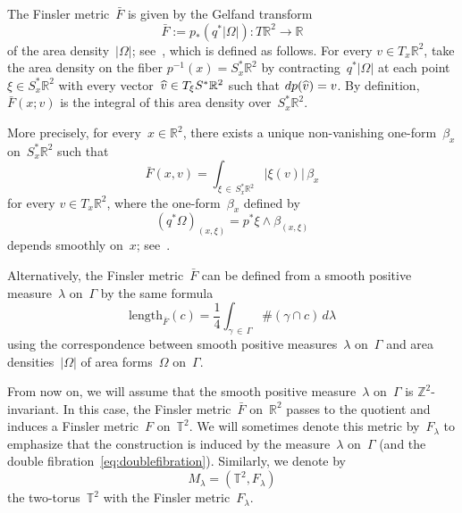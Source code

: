 \documentclass[AHL,Unicode,longabstracts,published]{cedram}
\newcommand{\Z}{\mathbb{Z}}
\newcommand{\R}{\mathbb{R}}
\newcommand{\T}{\mathbb{T}}
\newcommand{\length}{\mathrm{length}}
\let\oldhat\hat
\renewcommand*{\hat}[1]{\mathchoice{\widehat{#1}}{\widehat{#1}}{\oldhat{#1}}{\oldhat{#1}}}
\begin{document}
The Finsler metric~$\bar{F}$ is given by the Gelfand transform
\begin{equation}\label{eq:Gelfand}
\bar{F}:=p_*\left(q^*|\Omega|\right):T\R^2 \to \R
\end{equation}
of the area density~$|\Omega|$; see~\cite[Theorem~2.2]{AB}, which is defined as follows. For every $v \in T_x \R^2$, take the area density on the fiber $p^{-1}(x) = S_x^* \R^2$ by contracting~$q^* |\Omega|$ at each point~$\xi \in S_x^*\R^2$ with every vector~$\hat{v} \in T_\xi S^*\R^2$ such that $dp(\hat{v})=v$. By definition, $\bar{F}(x;v)$ is the integral of this area density over~$S_x^*\R^2$.

More precisely, for every~$x \in \R^2$, there exists a unique non-vanishing one-form~$\beta_{x}$ on~$S^{*}_{x}\R^2$ such that
\[
\bar{F}(x,v)=\int_{\xi\,\in\,S^{*}_{x}\R^2} |\xi(v)| \, \beta_{x}
\]
for every $v\in T_{x}\R^2$, where the one-form~$\beta_{x}$ defined by
\[
\left(q^* \Omega\right)_{(x,\xi)} = p^* \xi \wedge \beta_{(x,\xi)}
\]
depends smoothly on~$x$; see~\cite[Lemma~2.3]{AB}.

Alternatively, the Finsler metric~$\bar{F}$ can be defined from a smooth positive measure~$\lambda$ on~$\Gamma$ by the same formula
\[
\length_{\bar{F}}(c)=\frac{1}{4} \int_{\gamma\,\in\,\Gamma} \#(\gamma\cap c) \, d\lambda
\]
using the correspondence between smooth positive measures~$\lambda$ on~$\Gamma$ and area densities~$|\Omega|$ of area forms~$\Omega$ on~$\Gamma$.

From now on, we will assume that the smooth positive measure~$\lambda$ on~$\Gamma$ is $\Z^2$-invariant. In this case, the Finsler metric~$\bar{F}$ on~$\R^2$ passes to the quotient and induces a Finsler metric~$F$ on~$\T^2$. We will sometimes denote this metric by~$F_\lambda$ to emphasize that the construction is induced by the measure~$\lambda$ on~$\Gamma$ (and the double fibration~\eqref{eq:doublefibration}). Similarly, we denote by
\begin{equation}\label{eq:Mlambda}
M_\lambda=\left(\T^2,F_\lambda\right)
\end{equation}
the two-torus~$\T^2$ with the Finsler metric~$F_\lambda$. 
\end{document}
